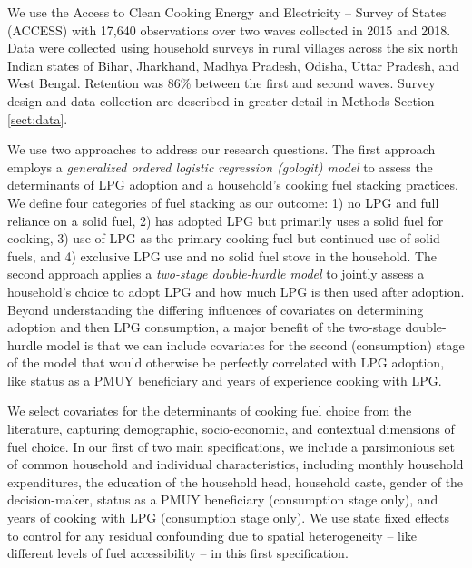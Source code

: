 \documentclass[11pt,english]{article}
\theoremstyle{plain} \newtheorem{claim}{Claim}
\theoremstyle{plain} \newtheorem{prop}{Proposition}
\theoremstyle{plain} \newtheorem{hypo}{Hypothesis}
\begin{document}
We use the Access to Clean Cooking Energy and Electricity -- Survey of States (ACCESS) with 17,640 observations over two waves collected in 2015 and 2018. Data were collected using household surveys in rural villages across the six north Indian states of Bihar, Jharkhand, Madhya Pradesh, Odisha, Uttar Pradesh, and West Bengal. Retention was 86\% between the first and second waves. Survey design and data collection are described in greater detail in Methods Section \ref{sect:data}. 

We use two approaches to address our research questions. The first approach employs a \textit{generalized ordered logistic regression (gologit) model} to assess the determinants of LPG adoption and a household's cooking fuel stacking practices. We define four categories of fuel stacking as our outcome: 1) no LPG and full reliance on a solid fuel, 2) has adopted LPG but primarily uses a solid fuel for cooking, 3) use of LPG as the primary cooking fuel but continued use of solid fuels, and 4) exclusive LPG use and no solid fuel stove in the household. The second approach applies a \textit{two-stage double-hurdle model} to jointly assess a household's choice to adopt LPG and how much LPG is then used after adoption. Beyond understanding the differing influences of covariates on determining adoption and then LPG consumption, a major benefit of the two-stage double-hurdle model is that we can include covariates for the second (consumption) stage of the model that would otherwise be perfectly correlated with LPG adoption, like status as a PMUY beneficiary and years of experience cooking with LPG.

We select covariates for the determinants of cooking fuel choice from the literature, capturing demographic, socio-economic, and contextual dimensions of fuel choice. In our first of two main specifications, we include a parsimonious set of common household and individual characteristics, including monthly household expenditures, the education of the household head, household caste, gender of the decision-maker, status as a PMUY beneficiary (consumption stage only), and years of cooking with LPG (consumption stage only). We use state fixed effects to control for any residual confounding due to spatial heterogeneity -- like different levels of fuel accessibility -- in this first specification. 
\end{document}
